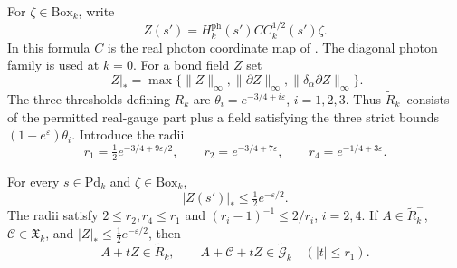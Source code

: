 For $\zeta\in\mathrm{Box}_k$, write
\begin{equation}\label{eq:rgnl-weakened-photon}
 Z(s')=H_k^{\mathrm{ph}}(s')C C_k^{1/2}(s')\zeta .
\end{equation}
In this formula $C$ is the real photon coordinate map of
. The diagonal photon
family is used at $k=0$. For a bond field $Z$ set
\[
 |Z|_*=\max\{\|Z\|_\infty,\|\partial Z\|_\infty,
                              \|\delta_\alpha\partial Z\|_\infty\}.
\]
The three thresholds defining $R_k$ are
$\theta_i=e^{-3/4+i\varepsilon}$, $i=1,2,3$.
Thus $\widetilde R_k^-$ consists of the permitted real-gauge
part plus a field satisfying the three strict bounds
$(1-e^\varepsilon)\theta_i$.
Introduce the radii
\begin{equation}\label{eq:rgnl-contour-radii}
 r_1=\tfrac12e^{-3/4+9\varepsilon/2},\qquad
 r_2=e^{-3/4+7\varepsilon},\qquad
 r_4=e^{-1/4+3\varepsilon}.
\end{equation}

\begin{proposition}\label{prop:rgnl-contour-domains}
For every $s\in\mathrm{Pd}_k$ and
$\zeta\in\mathrm{Box}_k$,
\[
 |Z(s')|_*\le\tfrac12e^{-\varepsilon/2}.
\]
The radii satisfy $2\le r_2,r_4\le r_1$ and
$(r_i-1)^{-1}\le2/r_i$, $i=2,4$.
If $A\in\widetilde R_k^-$, $\mathscr C\in\mathfrak X_k$,
and $|Z|_*\le\tfrac12e^{-\varepsilon/2}$, then
\[
 A+tZ\in\widetilde R_k,\qquad
 A+\mathscr C+tZ\in\widetilde{\mathcal G}_k
                  \quad (|t|\le r_1).
\]
\end{proposition}

